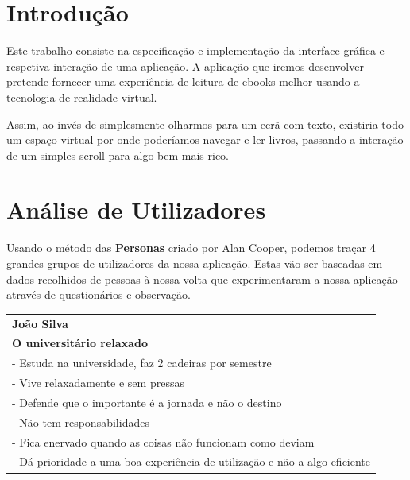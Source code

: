 \documentclass[11pt]{article}
\begin{document}
	
	
	\tableofcontents
	\pagebreak
	
	\large
	\section{Introdução}
	\normalsize
	
	Este trabalho consiste na especificação e implementação da interface gráfica e respetiva interação de uma aplicação. A aplicação que iremos desenvolver pretende fornecer uma experiência de leitura de ebooks melhor usando a tecnologia de realidade virtual. 
	
	Assim, ao invés de simplesmente olharmos para um ecrã com texto, existiria todo um espaço virtual por onde poderíamos navegar e ler livros, passando a interação de um simples scroll para algo bem mais rico.
	

	\large
	\section{Análise de Utilizadores}
	\normalsize
	
	Usando o método das \textbf{Personas} criado por Alan Cooper, podemos traçar 4 grandes grupos de utilizadores da nossa aplicação. Estas vão ser baseadas em dados recolhidos de pessoas à nossa volta que experimentaram a nossa aplicação através de questionários e observação.
	
	\begin{tabularx}{\textwidth}{|X|}
		\hline
		\textbf{João Silva} \\
		\textbf{O universitário relaxado} \\
		\hline
		\hspace{5mm} - Estuda na universidade, faz 2 cadeiras por semestre \\
		\hspace{5mm} - Vive relaxadamente e sem pressas \\
		\hspace{5mm} - Defende que o importante é a jornada e não o destino \\
		\hspace{5mm} - Não tem responsabilidades \\
		\hspace{5mm} - Fica enervado quando as coisas não funcionam como deviam \\
		\hspace{5mm} - Dá prioridade a uma boa experiência de utilização e não a algo eficiente \\
		\hline
	\end{tabularx}
\end{document}
